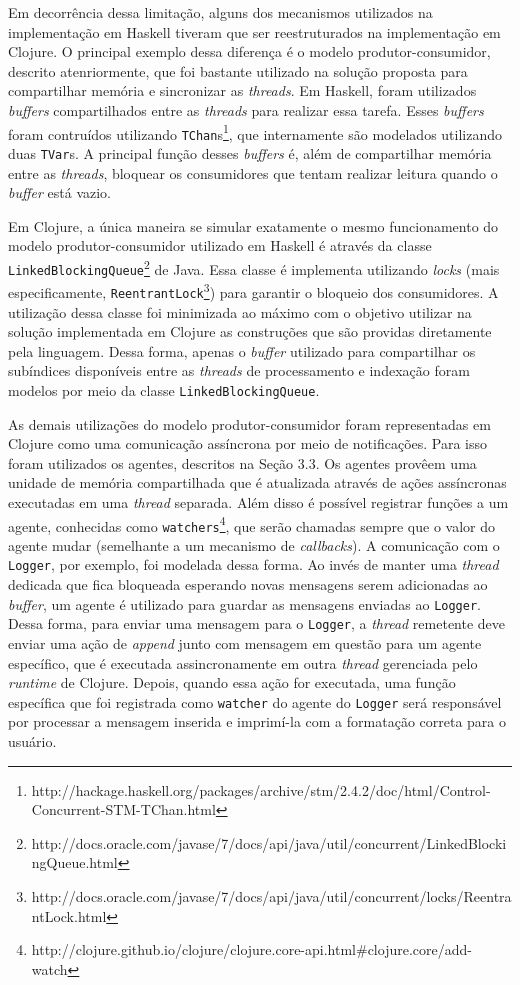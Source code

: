 Em decorrência dessa limitação, alguns dos mecanismos utilizados na implementação em Haskell tiveram que ser reestruturados na implementação em Clojure. O principal exemplo dessa diferença é o modelo produtor-consumidor, descrito atenriormente, que foi bastante utilizado na solução proposta para compartilhar memória e sincronizar as \emph{threads}. Em Haskell, foram utilizados \emph{buffers} compartilhados entre as \emph{threads} para realizar essa tarefa. Esses \emph{buffers} foram contruídos utilizando \verb|TChan|s\footnote{http://hackage.haskell.org/packages/archive/stm/2.4.2/doc/html/Control-Concurrent-STM-TChan.html}, que internamente são modelados utilizando duas \verb|TVar|s. A principal função desses \emph{buffers} é, além de compartilhar memória entre as \emph{threads}, bloquear os consumidores que tentam realizar leitura quando o \emph{buffer} está vazio.

Em Clojure, a única maneira se simular exatamente o mesmo funcionamento do modelo produtor-consumidor utilizado em Haskell é através da classe \verb|LinkedBlockingQueue|\footnote{http://docs.oracle.com/javase/7/docs/api/java/util/concurrent/LinkedBlockingQueue.html} de Java. Essa classe é implementa utilizando \emph{locks} (mais especificamente, \verb|ReentrantLock|\footnote{http://docs.oracle.com/javase/7/docs/api/java/util/concurrent/locks/ReentrantLock.html}) para garantir o bloqueio dos consumidores. A utilização dessa classe foi minimizada ao máximo com o objetivo utilizar na solução implementada em Clojure as construções que são providas diretamente pela linguagem. Dessa forma, apenas o \emph{buffer} utilizado para compartilhar os subíndices disponíveis entre as \emph{threads} de processamento e indexação foram modelos por meio da classe \verb|LinkedBlockingQueue|.

As demais utilizações do modelo produtor-consumidor foram representadas em Clojure como uma comunicação assíncrona por meio de notificações. Para isso foram utilizados os agentes, descritos na Seção 3.3. Os agentes provêem uma unidade de memória compartilhada que é atualizada através de ações assíncronas executadas em uma \emph{thread} separada. Além disso é possível registrar funções a um agente, conhecidas como \verb|watchers|\footnote{http://clojure.github.io/clojure/clojure.core-api.html\#clojure.core/add-watch}, que serão chamadas sempre que o valor do agente mudar (semelhante a um mecanismo de \emph{callbacks}). A comunicação com o \verb|Logger|, por exemplo, foi modelada dessa forma. Ao invés de manter uma \emph{thread} dedicada que fica bloqueada esperando novas mensagens serem adicionadas ao \emph{buffer}, um agente é utilizado para guardar as mensagens enviadas ao \verb|Logger|. Dessa forma, para enviar uma mensagem para o \verb|Logger|, a \emph{thread} remetente deve enviar uma ação de \emph{append} junto com mensagem em questão para um agente específico, que é executada assincronamente em outra \emph{thread} gerenciada pelo \emph{runtime} de Clojure. Depois, quando essa ação for executada, uma função específica que foi registrada como \verb|watcher| do agente do \verb|Logger| será responsável por processar a mensagem inserida e imprimí-la com a formatação correta para o usuário.

